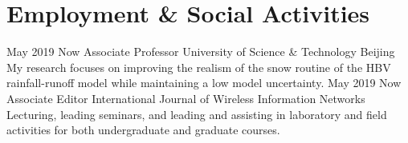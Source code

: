     \section{Employment \& Social Activities}
        \position
            {May 2019 \textemdash{} Now}
            {Associate Professor}
            {University of Science \& Technology Beijing}
            {My research focuses on improving the realism of the snow routine of the HBV rainfall-runoff model while maintaining a low model uncertainty.}
        \position
            {May 2019 \textemdash{} Now}
            {Associate Editor}
            {International Journal of Wireless Information Networks}
            {Lecturing, leading seminars, and leading and assisting in laboratory and field activities for both undergraduate and graduate courses.}
\fi
